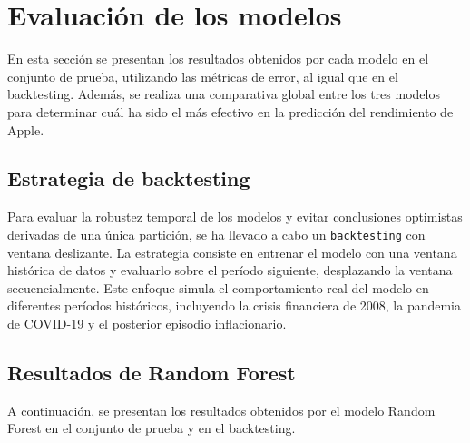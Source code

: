 \section{Evaluación de los modelos}
\label{sec:resultadosMods}
En esta sección se presentan los resultados obtenidos por cada modelo en el conjunto de prueba, utilizando las métricas de error, al igual que en el backtesting. Además, se realiza una comparativa global entre los tres modelos para determinar cuál ha sido el más efectivo en la predicción del rendimiento de Apple.

\subsection{Estrategia de backtesting}
Para evaluar la robustez temporal de los modelos y evitar conclusiones optimistas derivadas de una única partición, se ha llevado a cabo un \texttt{backtesting} con ventana deslizante. La estrategia consiste en entrenar el modelo con una ventana histórica de datos y evaluarlo sobre el período siguiente, desplazando la ventana secuencialmente. Este enfoque simula el comportamiento real del modelo en diferentes períodos históricos, incluyendo la crisis financiera de 2008, la pandemia de COVID-19 y el posterior episodio inflacionario.

\subsection{Resultados de Random Forest}
A continuación, se presentan los resultados obtenidos por el modelo Random Forest en el conjunto de prueba y en el backtesting.

